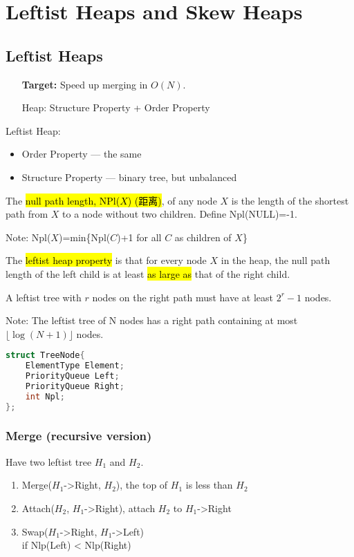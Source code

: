 \newpage
\section{Leftist Heaps and Skew Heaps}

\subsection{Leftist Heaps}
\begin{itemize}
    \item [\textbf{Target:}] Speed up merging in $O(N)$.
    \item [Heap:] Structure Property + Order Property
\end{itemize} 
Leftist Heap:
\begin{itemize}
    \item Order Property --- the same
    \item Structure Property --- binary tree, but unbalanced
\end{itemize}

\begin{definition}
    The \hl{null path length, NPl($X$) (距离)}, of any node $X$ is the length of the shortest path from $X$ to a node without two children. Define Npl(NULL)=-1. 
\end{definition}
Note: Npl($X$)=min\{Npl($C$)+1 for all $C$ as children of $X$\}

\begin{definition}
    The \hl{leftist heap property} is that for every node $X$ in the heap, the null path length of the \textcolor{light_green}{left} child is at least \hl{as large as} that of the \textcolor{light_green}{right} child. 
\end{definition}

\begin{theorem}
    A leftist tree with $r$ nodes on the right path must have at least $2^r-1$ nodes.
\end{theorem}

Note: The leftist tree of N nodes has a right path containing at most $\lfloor\log(N+1)\rfloor$ nodes. 

\begin{lstlisting}[language=c++,title={Declaration}]
struct TreeNode{
    ElementType Element;
    PriorityQueue Left;
    PriorityQueue Right;
    int Npl;
};
\end{lstlisting}

\subsubsection{Merge (recursive version)}
Have two leftist tree $H_1$ and $H_2$. 
\begin{enumerate}
    \item Merge($H_1$->Right, $H_2$), the top of $H_1$ is less than $H_2$
    \item Attach($H_2$, $H_1$->Right), attach $H_2$ to $H_1$->Right 
    \item Swap($H_1$->Right, $H_1$->Left)\\ if Nlp(Left) < Nlp(Right) 
\end{enumerate}


